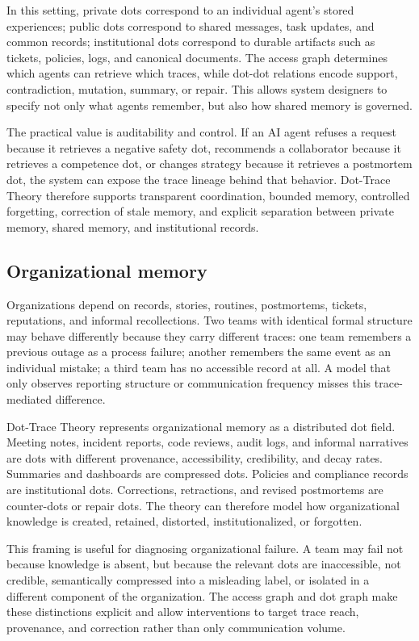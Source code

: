 \documentclass[11pt]{article}
\theoremstyle{remark}
\begin{document}
In this setting, private dots correspond to an individual agent's stored experiences; public dots correspond to shared messages, task updates, and common records; institutional dots correspond to durable artifacts such as tickets, policies, logs, and canonical documents. The access graph determines which agents can retrieve which traces, while dot-dot relations encode support, contradiction, mutation, summary, or repair. This allows system designers to specify not only what agents remember, but also how shared memory is governed.

The practical value is auditability and control. If an AI agent refuses a request because it retrieves a negative safety dot, recommends a collaborator because it retrieves a competence dot, or changes strategy because it retrieves a postmortem dot, the system can expose the trace lineage behind that behavior. Dot-Trace Theory therefore supports transparent coordination, bounded memory, controlled forgetting, correction of stale memory, and explicit separation between private memory, shared memory, and institutional records.

\subsection{Organizational memory}\label{organizational-memory}

Organizations depend on records, stories, routines, postmortems, tickets, reputations, and informal recollections. Two teams with identical formal structure may behave differently because they carry different traces: one team remembers a previous outage as a process failure; another remembers the same event as an individual mistake; a third team has no accessible record at all. A model that only observes reporting structure or communication frequency misses this trace-mediated difference.

Dot-Trace Theory represents organizational memory as a distributed dot field. Meeting notes, incident reports, code reviews, audit logs, and informal narratives are dots with different provenance, accessibility, credibility, and decay rates. Summaries and dashboards are compressed dots. Policies and compliance records are institutional dots. Corrections, retractions, and revised postmortems are counter-dots or repair dots. The theory can therefore model how organizational knowledge is created, retained, distorted, institutionalized, or forgotten.

This framing is useful for diagnosing organizational failure. A team may fail not because knowledge is absent, but because the relevant dots are inaccessible, not credible, semantically compressed into a misleading label, or isolated in a different component of the organization. The access graph and dot graph make these distinctions explicit and allow interventions to target trace reach, provenance, and correction rather than only communication volume.
\end{document}
